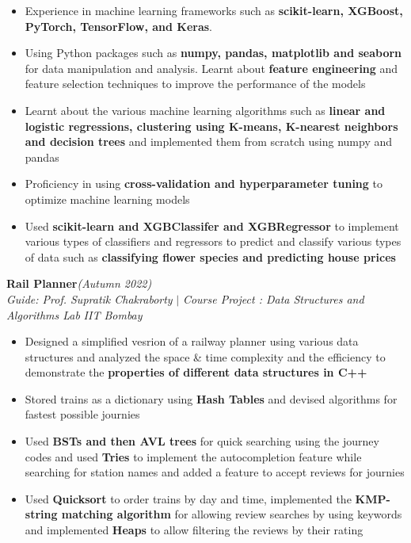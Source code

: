 \documentclass[a4paper,10pt]{article}
\begin{document}
\begin{itemize}[itemsep = -0.65 mm, leftmargin=*]
    \item Experience in machine learning frameworks such as \textbf{scikit-learn, XGBoost, PyTorch, TensorFlow, and Keras}.
    \item Using Python packages such as \textbf{numpy, pandas, matplotlib and seaborn} for data manipulation and analysis. Learnt about \textbf{feature engineering} and feature selection techniques to improve the performance of the models
    \item Learnt about the various machine learning algorithms such as \textbf{linear and logistic regressions, clustering using K-means, K-nearest neighbors and decision trees} and implemented them from scratch using numpy and pandas
    \item Proficiency in using \textbf{cross-validation and hyperparameter tuning} to optimize machine learning models
    \item Used \textbf{scikit-learn and XGBClassifer and XGBRegressor} to implement various types of classifiers and regressors to predict and classify various types of data such as \textbf{classifying flower species and predicting house prices}
\end{itemize}
\vspace{\baselineskip}
\vspace{-15pt}
\noindent\textbf{\large Rail Planner}\hfill{\sl \small (Autumn 2022)}\\
{\it Guide: Prof. Supratik Chakraborty} $|$ {\it Course Project : Data Structures and Algorithms Lab} \hfill{\it IIT Bombay}
\\\vspace{-15pt}
\begin{itemize}[itemsep = -0.65 mm, leftmargin=*]
    \item Designed a simplified vesrion of a railway planner using various data structures and analyzed the space \& time complexity and the efficiency to demonstrate the \textbf{properties of different data structures in C++}
    \item Stored trains as a dictionary using \textbf{Hash Tables} and devised algorithms for fastest possible journies
    \item Used \textbf{BSTs and then AVL trees} for quick searching using the journey codes and used \textbf{Tries} to implement the autocompletion feature while searching for station names and added a feature to accept reviews for journies
    \item Used \textbf{Quicksort} to order trains by day and time, implemented the \textbf{KMP-string matching algorithm} for allowing review searches by using keywords and implemented \textbf{Heaps} to allow filtering the reviews by their rating
\end{itemize}
\end{document}
